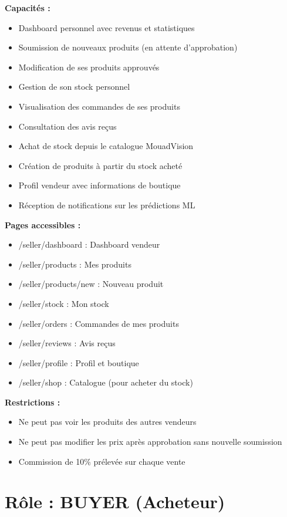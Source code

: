 \documentclass[12pt,a4paper]{report}
\begin{document}
\textbf{Capacités :}
\begin{itemize}[noitemsep]
    \item Dashboard personnel avec revenus et statistiques
    \item Soumission de nouveaux produits (en attente d'approbation)
    \item Modification de ses produits approuvés
    \item Gestion de son stock personnel
    \item Visualisation des commandes de ses produits
    \item Consultation des avis reçus
    \item Achat de stock depuis le catalogue MouadVision
    \item Création de produits à partir du stock acheté
    \item Profil vendeur avec informations de boutique
    \item Réception de notifications sur les prédictions ML
\end{itemize}

\textbf{Pages accessibles :}
\begin{itemize}[noitemsep]
    \item /seller/dashboard : Dashboard vendeur
    \item /seller/products : Mes produits
    \item /seller/products/new : Nouveau produit
    \item /seller/stock : Mon stock
    \item /seller/orders : Commandes de mes produits
    \item /seller/reviews : Avis reçus
    \item /seller/profile : Profil et boutique
    \item /seller/shop : Catalogue (pour acheter du stock)
\end{itemize}

\textbf{Restrictions :}
\begin{itemize}[noitemsep]
    \item Ne peut pas voir les produits des autres vendeurs
    \item Ne peut pas modifier les prix après approbation sans nouvelle soumission
    \item Commission de 10\% prélevée sur chaque vente
\end{itemize}

\section{Rôle : BUYER (Acheteur)}
\end{document}
